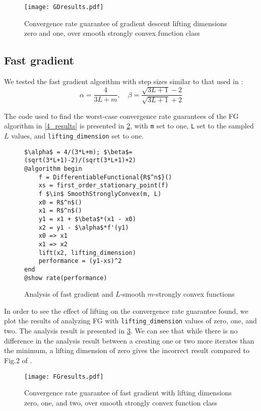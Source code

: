 \begin{figure}[h]
    \centering
    \texttt{[image: GDresults.pdf]}
    \caption{Convergence rate guarantee of gradient descent lifting dimensions zero and one, over smooth strongly convex function class}
    \label{GDresults}
\end{figure}

\subsection*{Fast gradient}

We tested the fast gradient algorithm with step sizes similar to that used in \cite{tutorial}:
\[
\alpha = \frac{4}{3L + m}, \quad
\beta = \frac{\sqrt{3L + 1} - 2}{\sqrt{3L + 1} + 2}
\]

The code used to find the worst-case convergence rate guarantees of the FG algorithm in \cref{4_results} is presented in \cref{fg_code}, with \texttt{m} set to one, \texttt{L} set to the sampled $L$ values, and \texttt{lifting\_dimension} set to one.

\begin{figure}[h!]
	\begin{lstlisting}[mathescape]
$\alpha$ = 4/(3*L+m); $\beta$=(sqrt(3*L+1)-2)/(sqrt(3*L+1)+2)
@algorithm begin
    f = DifferentiableFunctional{R$^n$}()
    xs = first_order_stationary_point(f)
    f $\in$ SmoothStronglyConvex(m, L)
    x0 = R$^n$()
    x1 = R$^n$()
    y1 = x1 + $\beta$*(x1 - x0)
    x2 = y1 - $\alpha$*f'(y1)
    x0 => x1
    x1 => x2
    lift(x2, lifting_dimension)
    performance = (y1-xs)^2
end
@show rate(performance)
\end{lstlisting}
\caption{Analysis of fast gradient and $L$-smooth $m$-strongly convex functions}
\label{fg_code}
\end{figure}

In order to see the effect of lifting on the convergence rate guarantee found, we plot the results of analyzing FG with \texttt{lifting\_dimension} values of zero, one, and two. The analysis result is presented in \cref{FGresults}. We can see that while there is no difference in the analysis result between a creating one or two more iterates than the minimum, a lifting dimension of zero gives the incorrect result compared to Fig.2 of \cite{tutorial}.

\begin{figure}[h]
    \centering
    \texttt{[image: FGresults.pdf]}
    \caption{Convergence rate guarantee of fast gradient with lifting dimensions zero, one, and two, over smooth strongly convex function class}
    \label{FGresults}
\end{figure}

